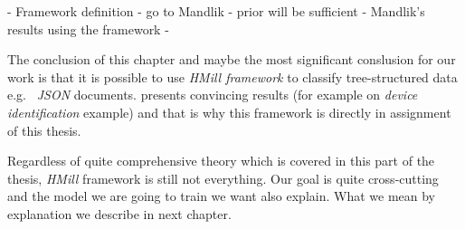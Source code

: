 - Framework definition
    - go to Mandlik
- prior will be sufficient
    - Mandlik's results using the framework
    - \cite{PevnyDedic2020}

The conclusion of this chapter and maybe the most significant conslusion for our work is that it is possible to use \emph{HMill framework} to classify tree-structured data e.g. \ \emph{JSON} documents. \citeauthor{Mandlik2020} presents convincing results (for example on \emph{device identification} example) and that is why this framework is directly in assignment of this thesis.

Regardless of quite comprehensive theory which is covered in this part of the thesis, \emph{HMill} framework is still not everything. Our goal is quite cross-cutting and the model we are going to train we want also explain. What we mean by explanation we describe in next chapter.






